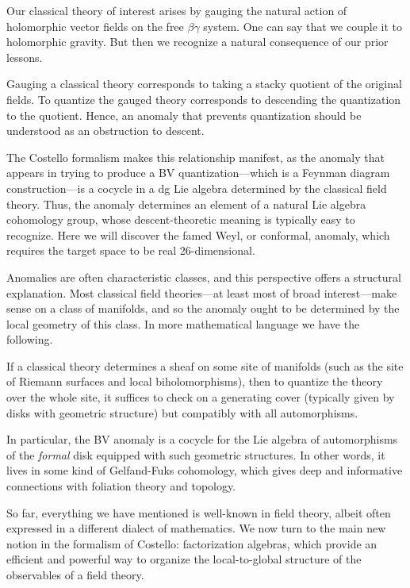 Our classical theory of interest arises by gauging the natural action of holomorphic vector fields on the free $\beta\gamma$ system.
One can say that we couple it to holomorphic gravity.
But then we recognize a natural consequence of our prior lessons.

\begin{lesson}
Gauging a classical theory corresponds to taking a stacky quotient of the original fields. 
To quantize the gauged theory corresponds to descending the quantization to the quotient.
Hence, an anomaly that prevents quantization should be understood as an obstruction to descent.
\end{lesson}

The Costello formalism makes this relationship manifest, 
as the anomaly that appears in trying to produce a BV quantization---which is a Feynman diagram construction---is a cocycle in a dg Lie algebra determined by the classical field theory.
Thus, the anomaly determines an element of a natural Lie algebra cohomology group,
whose descent-theoretic meaning is typically easy to recognize.
Here we will discover the famed Weyl, or conformal, anomaly, which requires the target space to be real 26-dimensional. 

Anomalies are often characteristic classes, and this perspective offers a structural explanation.
Most classical field theories---at least most of broad interest---make sense on a class of manifolds,
and so the anomaly ought to be determined by the local geometry of this class.
In more mathematical language we have the following.

\begin{lesson}
If a classical theory determines a sheaf on some site of manifolds (such as the site of Riemann surfaces and local biholomorphisms), 
then to quantize the theory over the whole site, 
it suffices to check on a generating cover (typically given by disks with geometric structure) but compatibly with all automorphisms.
\end{lesson}

In particular, the BV anomaly is a cocycle for the Lie algebra of automorphisms of the {\em formal} disk equipped with such geometric structures.
In other words, it lives in some kind of Gelfand-Fuks cohomology, which gives deep and informative connections with foliation theory and topology.

So far, everything we have mentioned is well-known in field theory, 
albeit often expressed in a different dialect of mathematics.
We now turn to the main new notion in the formalism of Costello:
factorization algebras, which provide an efficient and powerful way to organize the local-to-global structure of the observables of a field theory.


